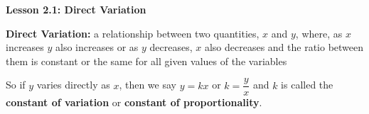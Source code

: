  \begin{center}
\textbf{Lesson 2.1: Direct Variation}
\end{center}

\vspace*{-1.5ex}

\textbf{Direct Variation:} a relationship between two quantities, $x$ and $y$, where, as $x$ increases $y$ also increases or as $y$ decreases, $x$ also decreases and the ratio between them is constant or the same for all given values of the variables

So if $y$ varies directly as $x$, then we say $y = kx$ or $ k = \dfrac{y}{x}$ and $k$ is called the \textbf{constant of variation}  or \textbf{constant of proportionality}.

